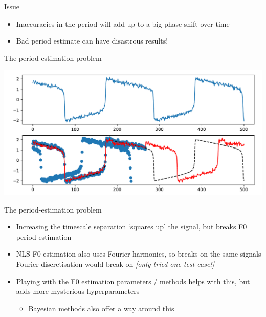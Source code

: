 \documentclass[presentation]{beamer}
\begin{document}
\begin{frame}[label={sec:orgc32779a}]{Issue}
\begin{itemize}
\item Inaccuracies in the period will add up to a big phase shift over time
\item Bad period estimate can have disastrous results!
\end{itemize}
\end{frame}

\begin{frame}[label={sec:org58b1c1c}]{The period-estimation problem}
\begin{center}
\includegraphics[width=.9\linewidth]{./brokenF0.pdf}
\end{center}
\end{frame}

\begin{frame}[label={sec:orgaf032a0}]{The period-estimation problem}
\begin{itemize}
\item Increasing the timescale separation `squares up' the signal, but breaks F0 period estimation
\item NLS F0 estimation also uses Fourier harmonics, so breaks on the same signals Fourier discretisation would break on \emph{[only tried one test-case!]}
\item Playing with the F0 estimation parameters / methods helps with this, but adds more mysterious hyperparameters
\begin{itemize}
\item Bayesian methods also offer a way around this
\end{itemize}
\end{itemize}
\end{frame}
\end{document}
